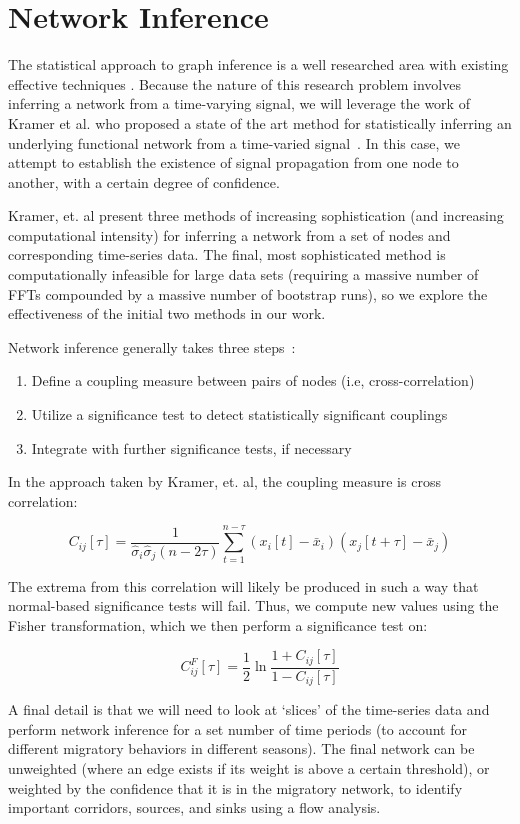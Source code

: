\documentclass{article} %
\begin{document}
\section{Network Inference} 
The statistical approach to graph inference is a well researched area with existing effective techniques \cite{AlbertMechanics}. Because the nature of this research problem involves inferring a network from a time-varying signal, we will leverage the work of Kramer et al. who proposed a state of the art method for statistically inferring an underlying functional network from a time-varied signal~\cite{kramer}. In this case, we attempt to establish the existence of signal propagation from one node to another, with a certain degree of confidence. 

Kramer, et. al present three methods of increasing sophistication (and increasing computational intensity) for inferring a network from a set of nodes and corresponding time-series data. The final, most sophisticated method is computationally infeasible for large data sets (requiring a massive number of FFTs compounded by a massive number of bootstrap runs), so we explore the effectiveness of the initial two methods in our work. 

Network inference generally takes three steps~\cite{kramer}:
\begin{enumerate}
\item Define a coupling measure between pairs of nodes (i.e, cross-correlation)
\item Utilize a significance test to detect statistically significant couplings
\item Integrate with further significance tests, if necessary
\end{enumerate}

In the approach taken by Kramer, et. al, the coupling measure is cross correlation:

\[ C_{ij}[\tau] = \frac{1}{\hat\sigma_i\hat\sigma_j (n-2\tau)}\sum_{t=1}^{n-\tau}(x_i[t] - \bar x_i )(x_j[t+\tau] - \bar x_j) \]

The extrema from this correlation will likely be produced in such a way that normal-based significance tests will fail. Thus, we compute new values using the Fisher transformation, which we then perform a significance test on:

\[ C_{ij}^F [\tau] = \frac{1}{2} \ln \frac{1+C_{ij}[\tau]}{1-C_{ij}[\tau]} \]

A final detail is that we will need to look at `slices' of the time-series data and perform network inference for a set number of time periods (to account for different migratory behaviors in different seasons). The final network can be unweighted (where an edge exists if its weight is above a certain threshold), or weighted by the confidence that it is in the migratory network, to identify important corridors, sources, and sinks using a flow analysis. 
\end{document}
